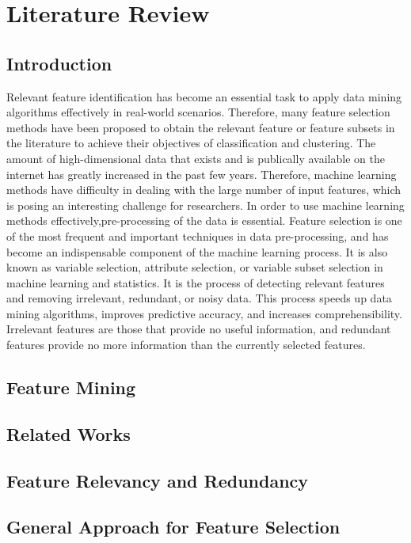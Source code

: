 \documentclass[document.tex]{subfiles}
\begin{document}
\chapter{Literature Review}

\section{Introduction}
\noindent Relevant feature identification has become an essential task to apply data mining algorithms effectively in real-world scenarios. Therefore, many feature selection methods have been proposed to obtain the relevant feature or feature subsets in the literature to achieve their objectives of classification and clustering.
The amount of high-dimensional data that exists and is publically available on the internet has greatly increased in the past few years. Therefore, machine learning methods have difficulty in dealing with the large number of input features, which is posing an interesting challenge for researchers. In order to use machine learning methods effectively,pre-processing of the data is essential. Feature selection is one of the most frequent and important techniques in data pre-processing, and has become an indispensable component of the machine learning process. It is also known as variable selection, attribute selection, or variable subset selection in machine learning and statistics. It is the process of detecting relevant features and removing irrelevant, redundant, or noisy data. This process speeds up data mining algorithms, improves predictive accuracy, and increases
comprehensibility. Irrelevant features are those that provide no useful information, and
redundant features provide no more information than the currently selected features.
\section{Feature Mining}

\section{Related Works}

\section{Feature Relevancy and Redundancy}

\section{General Approach for Feature Selection}
\end{document}
